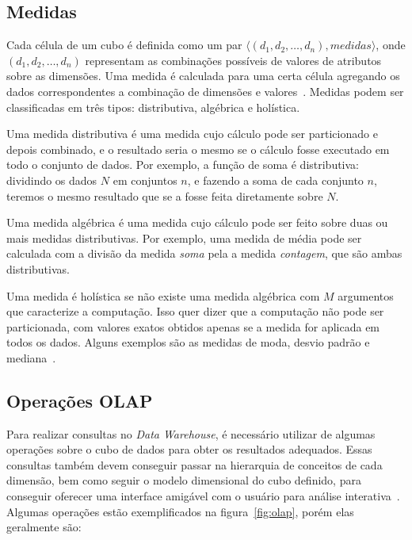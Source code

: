 \subsection{Medidas}\label{ch:fun:cube:measures}

Cada célula de um cubo é definida como um par $\langle (d_1, d_2, \ldots, d_n), medidas\rangle$, onde $(d_1, d_2, \ldots, d_n)$ representam as combinações possíveis de valores de atributos sobre as dimensões.
Uma medida é calculada para uma certa célula agregando os dados correspondentes a combinação de dimensões e valores~\cite{hanDataMiningConcepts2011}.
Medidas podem ser classificadas em três tipos: distributiva, algébrica e holística.

Uma medida distributiva é uma medida cujo cálculo pode ser particionado e depois combinado, e o resultado seria o mesmo se o cálculo fosse executado em todo o conjunto de dados.
Por exemplo, a função de soma é distributiva: dividindo os dados $N$ em conjuntos $n$, e fazendo a soma de cada conjunto $n$, teremos o mesmo resultado que se a fosse feita diretamente sobre $N$.

Uma medida algébrica é uma medida cujo cálculo pode ser feito sobre duas ou mais medidas distributivas.
Por exemplo, uma medida de média pode ser calculada com a divisão da medida \textit{soma} pela a medida \textit{contagem}, que são ambas distributivas.

Uma medida é holística se não existe uma medida algébrica com $M$ argumentos que caracterize a computação.
Isso quer dizer que a computação não pode ser particionada, com valores exatos obtidos apenas se a medida for aplicada em todos os dados.
Alguns exemplos são as medidas de moda, desvio padrão e mediana~\cite{hanDataMiningConcepts2011}.

\subsection{Operações OLAP}\label{ch:fun:cube:olapops}

Para realizar consultas no \textit{Data Warehouse}, é necessário utilizar de algumas operações sobre o cubo de dados para obter os resultados adequados.
Essas consultas também devem conseguir passar na hierarquia de conceitos de cada dimensão, bem como seguir o modelo dimensional do cubo definido, para conseguir oferecer uma interface amigável com o usuário para análise interativa~\cite{hanDataMiningConcepts2011}.
{\color{cerulean}
Algumas operações estão exemplificados na figura~\ref{fig:olap}, porém elas geralmente são:
}

